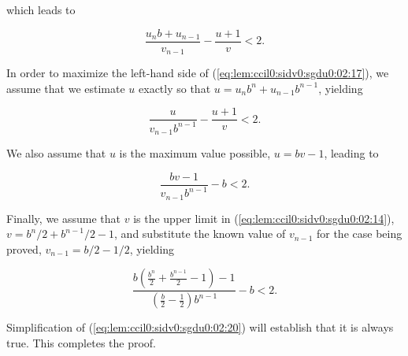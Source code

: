 \begin{vworklemmaproof}
which leads to

\begin{equation}
\label{eq:lem:ccil0:sidv0:sgdu0:02:17}
\frac{u_n b + u_{n-1}}{v_{n-1}}
                - \frac{u+1}{v}
                < 2 .
\end{equation}

In order to maximize the left-hand side of
(\ref{eq:lem:ccil0:sidv0:sgdu0:02:17}), we assume that we
estimate $u$ exactly so that $u = u_n b^n + u_{n-1} b^{n-1}$,
yielding

\begin{equation}
\label{eq:lem:ccil0:sidv0:sgdu0:02:18}
\frac{u}{v_{n-1} b^{n-1}}
                - \frac{u+1}{v}
                < 2 .
\end{equation}

We also assume that $u$ is the maximum value
possible, $u=bv-1$, leading to

\begin{equation}
\label{eq:lem:ccil0:sidv0:sgdu0:02:19}
\frac{bv-1}{v_{n-1} b^{n-1}}
                - b
                < 2 .
\end{equation}

Finally, we assume that $v$ is the upper limit in
(\ref{eq:lem:ccil0:sidv0:sgdu0:02:14}),
$v=b^n/2 + b^{n-1}/2 - 1$, and substitute the known value of
$v_{n-1}$ for the case being proved, $v_{n-1} = b/2-1/2$, yielding

\begin{equation}
\label{eq:lem:ccil0:sidv0:sgdu0:02:20}
\frac{b \left( \frac{b^n}{2} + \frac{b^{n-1}}{2} - 1 \right) - 1}
{\left( \frac{b}{2} - \frac{1}{2} \right) b^{n-1}}
                - b
                < 2 .
\end{equation}
 
Simplification of (\ref{eq:lem:ccil0:sidv0:sgdu0:02:20})
will establish that it is always true.  This completes the proof.
\end{vworklemmaproof}
\vworklemmafooter{}

